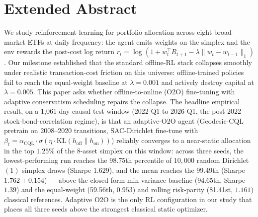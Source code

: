 
\section*{Extended Abstract}

We study reinforcement learning for portfolio allocation across eight
broad-market ETFs at daily frequency: the agent emits weights on the
simplex and the env rewards the post-cost log return $r_t = \log(1 +
w_t^\top R_{t+1} - \lambda \|w_t - w_{t-1}\|_1)$. Our milestone
established that the standard offline-RL stack collapses smoothly
under realistic transaction-cost friction on this universe:
offline-trained policies fail to reach the equal-weight baseline at
$\lambda{=}0.001$ and actively destroy capital at $\lambda{=}0.005$.
This paper asks whether offline-to-online (O2O) fine-tuning with
adaptive conservatism scheduling repairs the collapse. The headline
empirical result, on a 1{,}061-day causal test window (2022-Q1 to
2026-Q1, the post-2022 stock-bond-correlation regime), is that an
adaptive-O2O agent (Geodesic-CQL pretrain on 2008--2020 transitions,
SAC-Dirichlet fine-tune with $\beta_t = \alpha_{\mathrm{CQL}} \cdot
\sigma(\eta \cdot \mathrm{KL}(h_{\text{off}} \| h_{\text{on}}))$)
reliably converges to a near-static allocation in the top $1.25\%$ of
the 8-asset simplex on this window: across three seeds, the
lowest-performing run reaches the 98.75th percentile of $10{,}000$
random Dirichlet$(1)$ simplex draws (Sharpe $1.629$), and the mean
reaches the 99.49th (Sharpe $1.762 \pm 0.154$) --- above the
closed-form min-variance baseline (94.65th, Sharpe $1.39$) and the
equal-weight (59.56th, $0.953$) and rolling risk-parity (81.41st,
$1.161$) classical references. Adaptive O2O is the only RL
configuration in our study that places all three seeds above the
strongest classical static optimizer.

